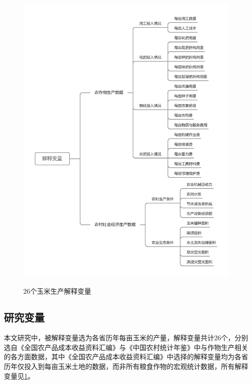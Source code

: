 \begin{figure}[htbp]
  \centering
  \resizebox{\textwidth}{!}
  {
  \includegraphics{figs/explanatory_variable.png}
  }
  \caption{26个玉米生产解释变量}
  \label{fig:explanatory_variable}
\end{figure}


\subsection{研究变量}
本文研究中，被解释变量选为各省历年每亩玉米的产量，解释变量共计26个，分别选自《全国农产品成本收益资料汇编》与《中国农村统计年鉴》中与作物生产相关的各方面数据，其中《全国农产品成本收益资料汇编》中选择的解释变量均为各省历年仅投入到每亩玉米土地的数据，而非所有粮食作物的宏观统计数据，所有解释变量见\ref{fig:explanatory_variable}。


